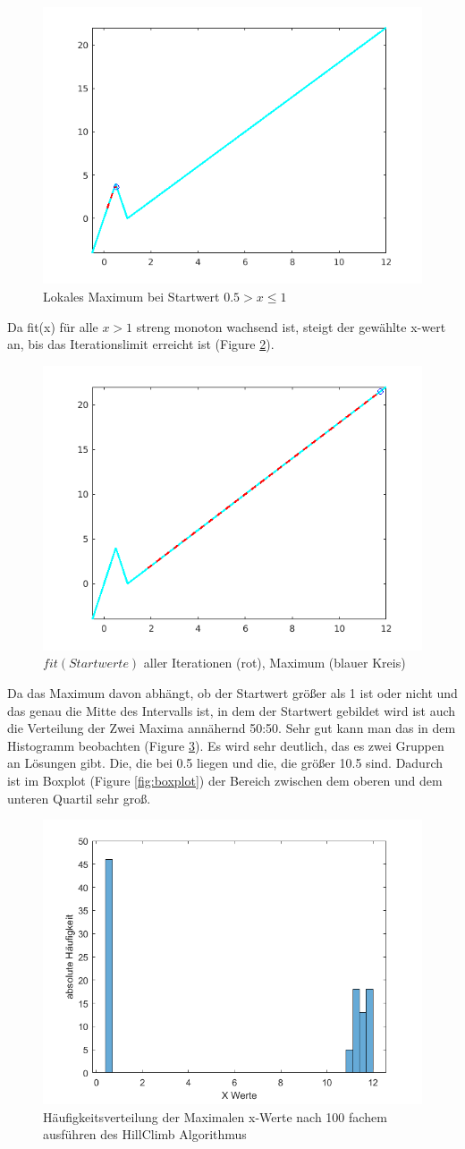 \documentclass{hbrs-ecta-report}
\begin{document}
\begin{figure}[h!]
	\includegraphics[width=0.5\linewidth]{img/plot_fit_local_max_left.png}
	\caption{Lokales Maximum bei Startwert  $0.5 > x\leq1$ }
	\label{fig:fit_local_max_left} 
\end{figure}
 Da fit(x) für alle $x>1$ streng monoton wachsend ist, steigt der gewählte x-wert 
an, bis das Iterationslimit erreicht ist (Figure \ref{fig:fit_max}). 
\begin{figure}[h!]
	\includegraphics[width=0.5\linewidth]{img/plot_fit_max.png}
	\caption{$fit(Startwerte)$ aller Iterationen (rot), Maximum \small(blauer Kreis)}
	\label{fig:fit_max} 
\end{figure}
Da das Maximum davon abhängt, ob der Startwert größer als 1 ist oder nicht und das genau die Mitte des Intervalls ist, in dem der Startwert gebildet wird ist auch die Verteilung der Zwei Maxima annähernd 50:50. Sehr gut kann man das in dem Histogramm beobachten (Figure \ref{fig:histogram}). Es wird sehr deutlich, das es zwei Gruppen an Lösungen gibt. Die, die bei 0.5 liegen und die, die größer 10.5 sind. Dadurch ist im Boxplot (Figure \ref{fig:boxplot}) der Bereich zwischen dem oberen und dem unteren Quartil sehr groß.
\begin{figure}[h!]
	\includegraphics[width=0.8\linewidth]{img/histogram_of_100_HillClimbs.png}
	\caption{Häufigkeitsverteilung der Maximalen x-Werte nach 100 fachem ausführen des HillClimb Algorithmus}
	\label{fig:histogram} 
\end{figure}
\end{document}
